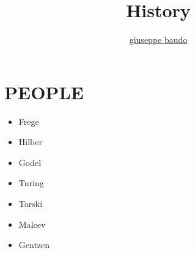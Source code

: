 \documentclass[a4paper,10pt]{article}
\title{History}
\author{\href{http://www.baudo.hol.es}{giuseppe baudo}}
\begin{document}
\maketitle

\section{PEOPLE}
\begin{itemize}
 \item Frege
 \item Hilber
 \item Godel
 \item Turing
 \item Tarski
 \item Malcev
 \item Gentzen
\end{itemize}
\end{document}
